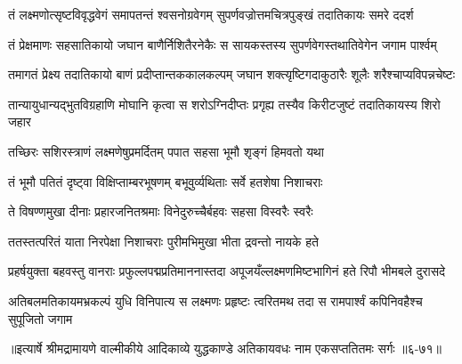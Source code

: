 \twolineshloka
{तं लक्ष्मणोत्सृष्टविवृद्धवेगं समापतन्तं श्वसनोग्रवेगम्}
{सुपर्णवज्रोत्तमचित्रपुङ्खं तदातिकायः समरे ददर्श} %

\twolineshloka
{तं प्रेक्षमाणः सहसातिकायो जघान बाणैर्निशितैरनेकैः}
{स सायकस्तस्य सुपर्णवेगस्तथातिवेगेन जगाम पार्श्वम्} %

\twolineshloka
{तमागतं प्रेक्ष्य तदातिकायो बाणं प्रदीप्तान्तककालकल्पम्}
{जघान शक्त्यृष्टिगदाकुठारैः शूलैः शरैश्चाप्यविपन्नचेष्टः} %

\twolineshloka
{तान्यायुधान्यद्भुतविग्रहाणि मोघानि कृत्वा स शरोऽग्निदीप्तः}
{प्रगृह्य तस्यैव किरीटजुष्टं तदातिकायस्य शिरो जहार} %

\twolineshloka
{तच्छिरः सशिरस्त्राणं लक्ष्मणेषुप्रमर्दितम्}
{पपात सहसा भूमौ शृङ्गं हिमवतो यथा} %

\twolineshloka
{तं भूमौ पतितं दृष्ट्वा विक्षिप्ताम्बरभूषणम्}
{बभूवुर्व्यथिताः सर्वे हतशेषा निशाचराः} %

\twolineshloka
{ते विषण्णमुखा दीनाः प्रहारजनितश्रमाः}
{विनेदुरुच्चैर्बहवः सहसा विस्वरैः स्वरैः} %

\twolineshloka
{ततस्तत्परितं याता निरपेक्षा निशाचराः}
{पुरीमभिमुखा भीता द्रवन्तो नायके हते} %

\twolineshloka
{प्रहर्षयुक्ता बहवस्तु वानराः प्रफुल्लपद्मप्रतिमाननास्तदा}
{अपूजयँल्लक्ष्मणमिष्टभागिनं हते रिपौ भीमबले दुरासदे} %

\twolineshloka
{अतिबलमतिकायमभ्रकल्पं युधि विनिपात्य स लक्ष्मणः प्रहृष्टः}
{त्वरितमथ तदा स रामपार्श्वं कपिनिवहैश्च सुपूजितो जगाम} %


॥इत्यार्षे श्रीमद्रामायणे वाल्मीकीये आदिकाव्ये युद्धकाण्डे अतिकायवधः नाम एकसप्ततितमः सर्गः ॥६-७१॥
